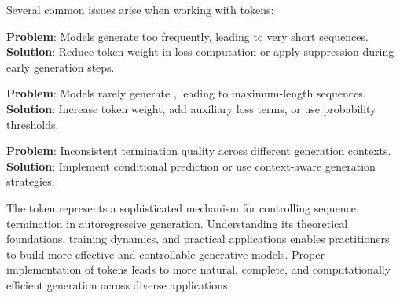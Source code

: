 Several common issues arise when working with \eos{} tokens:

\textbf{Problem}: Models generate \eos{} too frequently, leading to very short sequences.
\textbf{Solution}: Reduce \eos{} token weight in loss computation or apply \eos{} suppression during early generation steps.

\textbf{Problem}: Models rarely generate \eos{}, leading to maximum-length sequences.
\textbf{Solution}: Increase \eos{} token weight, add auxiliary loss terms, or use \eos{} probability thresholds.

\textbf{Problem}: Inconsistent termination quality across different generation contexts.
\textbf{Solution}: Implement conditional \eos{} prediction or use context-aware generation strategies.

The \eos{} token represents a sophisticated mechanism for controlling sequence termination in autoregressive generation. Understanding its theoretical foundations, training dynamics, and practical applications enables practitioners to build more effective and controllable generative models. Proper implementation of \eos{} tokens leads to more natural, complete, and computationally efficient generation across diverse applications.